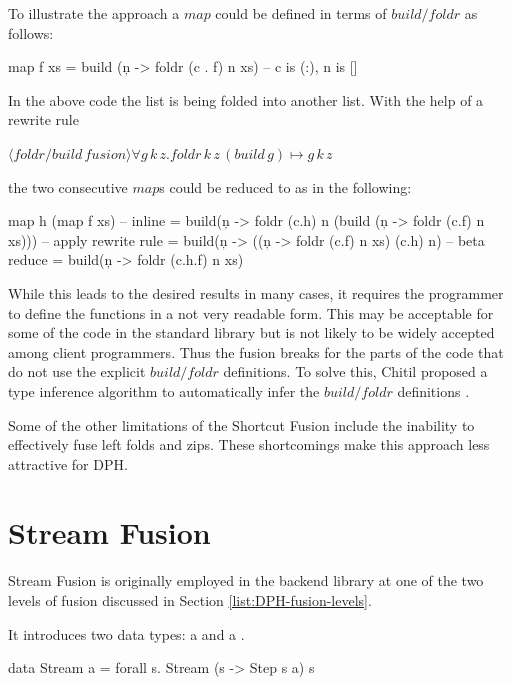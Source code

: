 \documentclass[preamble.tex]{subfiles}
\begin{document}
To illustrate the approach a $map$ could be defined in terms of $build/foldr$ as follows:

\begin{hscode}
map f xs = build (\c n -> foldr (c . f) n xs)
-- c is (:), n is []
\end{hscode}


In the above code the list is being folded into another list. With the help of a rewrite rule

$\langle foldr/build\, fusion \rangle\forall g\, k\, z.foldr\, k\, z\,(build\, g)\mapsto g\, k\, z$

the two consecutive $map$s could be reduced to as in the following:

\begin{hscode}
map h (map f xs)
 -- inline
 = build(\c n -> foldr (c.h) n 
  (build (\c n -> foldr (c.f) n xs)))
 -- apply rewrite rule
 = build(\c n -> ((\c n -> foldr (c.f) n xs) (c.h) n)
 -- beta reduce
 = build(\c n -> foldr (c.h.f) n xs)
\end{hscode}


While this leads to the desired results in many cases, it requires the programmer to define the functions in a not very readable form. This may be acceptable for some of the code in the standard library but is not likely to be widely accepted among client programmers. Thus the fusion breaks for the parts of the code that do not use the explicit $build/foldr$ definitions. To solve this, Chitil proposed a type inference algorithm to automatically infer the $build/foldr$ definitions \cite{Chi99}.

Some of the other limitations of the Shortcut Fusion include the inability to effectively fuse left folds and zips. These shortcomings make this approach less attractive for DPH.


\clearpage

\section{Stream Fusion}
\label{sec:Stream-Fusion}

Stream Fusion \cite{CLS07,CSL06} is originally employed in the \DPH backend library at one of the two levels of fusion discussed in Section \vref{list:DPH-fusion-levels}.

It introduces two data types: a  and a .

\begin{hscode}
data Stream a = forall s. Stream (s -> Step s a) s
\end{hscode}
\end{document}
